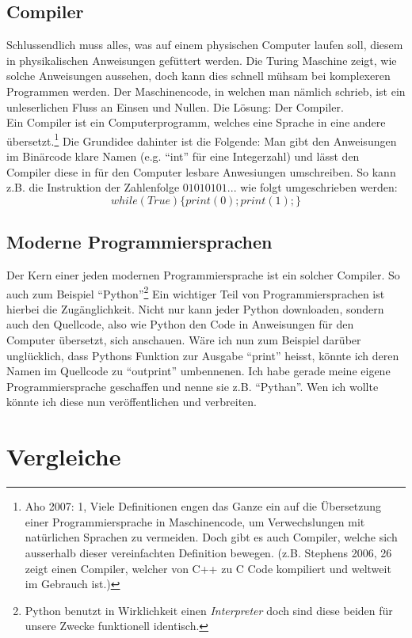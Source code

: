 \documentclass[a4paper,12pt]{article}
\begin{document}
\subsection{Compiler}
Schlussendlich muss alles, was auf einem physischen Computer laufen soll, diesem in physikalischen Anweisungen gefüttert werden. Die Turing Maschine zeigt, wie solche Anweisungen aussehen, doch kann dies schnell mühsam bei komplexeren Programmen werden. Der Maschinencode, in welchen man nämlich schrieb, ist ein unleserlichen Fluss an Einsen und Nullen. Die Lösung: Der Compiler. \\
Ein Compiler ist ein Computerprogramm, welches eine Sprache in eine andere übersetzt.\footnote{Aho 2007: 1, Viele Definitionen engen das Ganze ein auf die Übersetzung einer Programmiersprache in Maschinencode, um Verwechslungen mit natürlichen Sprachen zu vermeiden. Doch gibt es auch Compiler, welche sich ausserhalb dieser vereinfachten Definition bewegen. (z.B. Stephens 2006, 26 zeigt einen Compiler, welcher von C++ zu C Code kompiliert und weltweit im Gebrauch ist.)} Die Grundidee dahinter ist die Folgende: Man gibt den Anweisungen im Binärcode klare Namen (e.g. \enquote{int} für eine Integerzahl) und lässt den Compiler diese in für den Computer lesbare Anwesiungen umschreiben. So kann z.B. die Instruktion der Zahlenfolge $01010101...$ wie folgt umgeschrieben werden: 
$$ while (True) \{ print(0); print(1);\} $$

\subsection{Moderne Programmiersprachen}
Der Kern einer jeden modernen Programmiersprache ist ein solcher Compiler. So auch zum Beispiel \enquote{Python}\footnote{Python benutzt in Wirklichkeit einen \textit{Interpreter} doch sind diese beiden für unsere Zwecke funktionell identisch.} Ein wichtiger Teil von Programmiersprachen ist hierbei die Zugänglichkeit. Nicht nur kann jeder Python downloaden, sondern auch den Quellcode, also wie Python den Code in Anweisungen für den Computer übersetzt, sich anschauen. Wäre ich nun zum Beispiel darüber unglücklich, dass Pythons Funktion zur Ausgabe \enquote{print} heisst, könnte ich deren Namen im Quellcode zu \enquote{outprint} umbennenen. Ich habe gerade meine eigene Programmiersprache geschaffen und nenne sie z.B. \enquote{Pythan}. Wen ich wollte könnte ich diese nun veröffentlichen und verbreiten.



\section{Vergleiche}
\end{document}
